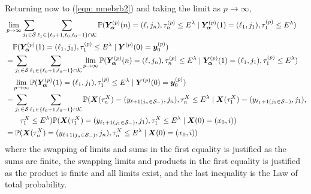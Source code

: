 Returning now to (\ref{eqn: mnebrb2}) and taking the limit as \(p\to \infty \),  
\begin{align}
	&\lim_{p\to\infty}\sum_{j_1\in\mathcal S}\sum_{\ell_1\in\{\ell_0+1,\ell_0,\ell_0-1\}\cap \mathcal K}\mathbb P(\bm{Y}_{\bm{\alpha}}^{(p)}(n) = (\ell, j_n), \tau_{n}^{(p)}\leq E^\lambda 
	 \mid \bm{Y}_{\bm{\alpha}}^{(p)}(1)=(\ell_1,j_1), \tau_{1}^{(p)}\leq E^{\lambda}) \nonumber 
	 \\& \quad\mathbb P(\bm{Y}_{\bm{\alpha}}^{(p)}(1)=(\ell_1, j_1), \tau_{1}^{(p)}\leq E^\lambda
	 \mid \boldsymbol Y^{(p)}(0)=\boldsymbol y_0^{(p)}) \nonumber
	 \\&= \sum_{j_1\in\mathcal S}\sum_{\ell_1\in\{\ell_0+1,\ell_0-1\}\cap \mathcal K} \lim_{p\to\infty} \mathbb P(\bm{Y}_{\bm{\alpha}}^{(p)}(n) = (\ell, j_n), \tau_{n}^{(p)}\leq E^\lambda 
	 \mid \bm{Y}_{\bm{\alpha}}^{(p)}(1)=(\ell_1, j_1), \tau_1^{(p)}\leq E^\lambda) \nonumber
	 \\& \quad\lim_{p\to\infty}\mathbb P(\bm{Y}_{\bm{\alpha}}^{(p)}(1)=(\ell_1, j_1), \tau_{1}^{(p)}\leq E^\lambda
	 \mid \boldsymbol Y^{(p)}(0)=\boldsymbol y_0^{(p)})\nonumber
	 \\&= \sum_{j_1\in\mathcal S}\sum_{\ell_1\in\{\ell_0+1,\ell_0-1\}\cap \mathcal K} \mathbb P(\boldsymbol X(\tau_n^X) = (y_{\ell+1(j_{n}\in\mathcal S_-)}, 
		j_n), \tau_{n}^X\leq E^\lambda \mid \nonumber
		\boldsymbol X(\tau_1^X)=(y_{\ell_{1}+1(j_{1}\in\mathcal S_-)},
		j_{1}),
		\\&\qquad{}\tau_1^X\leq E^\lambda) \nonumber
	 \mathbb P(\boldsymbol X(\tau_1^X)=(y_{\ell_{1}+1(j_{1}\in\mathcal S_-)},
		j_{1}),\tau_1^X\leq E^\lambda
		\mid \boldsymbol X(0)=(x_0, i)) \nonumber
	\\&=\mathbb P(\boldsymbol X(\tau_n^X) = (y_{\ell+1(j_{n}\in\mathcal S_-)}, 
		j_n), \tau_{n}^X\leq E^\lambda
		\mid \boldsymbol X(0)=(x_0, i))
	 \label{eqn: mnebrb22}
\end{align}
where the swapping of limits and sums in the first equality is justified as the sums are finite, the swapping limits and products in the first equality is justified as the product is finite and all limits exist, and the last inequality is the Law of total probability. 

